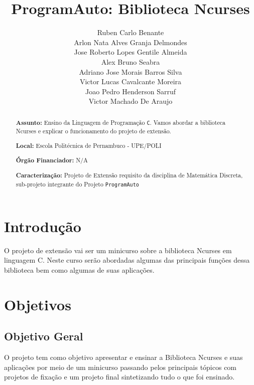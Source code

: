 \documentclass[a4paper,10pt]{article} %
\title{ProgramAuto: Biblioteca Ncurses}
\author{Ruben Carlo Benante \\ Arlon Nata Alves Granja Delmondes \\ Jose Roberto Lopes Gentile Almeida \\ Alex Bruno Seabra \\ Adriano Jose Morais Barros Silva \\ Victor Lucas Cavalcante Moreira \\ Joao Pedro Henderson Sarruf \\ Victor Machado De Araujo}
\begin{document}
\maketitle

\begin{abstract}

\textbf{Assunto:} Ensino da Linguagem de Programação \texttt{C}.
Vamos abordar a biblioteca Ncurses e explicar o funcionamento do projeto de extensão.



\textbf{Local:} Escola Politécnica de Pernambuco - UPE/POLI

\textbf{Órgão Financiador:} N/A

\textbf{Caracterização:} Projeto de Extensão requisito da disciplina de Matemática Discreta, sub-projeto integrante do Projeto \texttt{ProgramAuto}


\end{abstract}


\section{Introdução}

O projeto de extensão vai ser um minicurso sobre a biblioteca Ncurses em linguagem C. Neste curso serão abordadas algumas das principais funções dessa biblioteca bem como algumas de suas aplicações.


\section{Objetivos}

\subsection{Objetivo Geral}

O projeto tem como objetivo apresentar e ensinar a Biblioteca Ncurses e suas aplicações por meio de um minicurso passando pelos principais tópicos com projetos de fixação e um projeto final sintetizando tudo o que foi ensinado.
\end{document}
